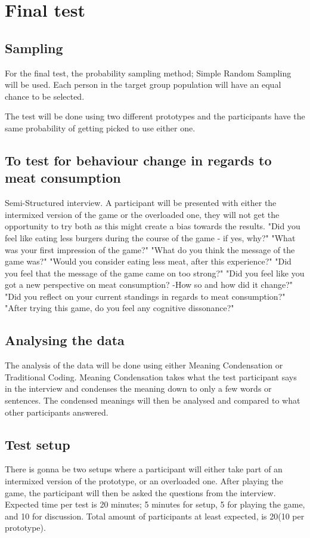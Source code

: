     \section{Final test}
     \subsection{Sampling}
     For the final test, the probability sampling method; Simple Random Sampling will be used\cite{bjoernerBog}. Each person in the target group population will have an equal chance to be selected.
     
     The test will be done using two different prototypes and the participants have the same probability of getting picked to use either one. 
    
    \subsection{To test for behaviour change in regards to meat consumption}
    Semi-Structured interview\cite{bjoernerBog}. A participant will be presented with either the intermixed version of the game or the overloaded one, they will not get the opportunity to try both as this might create a bias towards the results.
    "Did you feel like eating less burgers during the course of the game - if yes, why?"
    "What was your first impression of the game?"
    "What do you think the message of the game was?"
    "Would you consider eating less meat, after this experience?"
    "Did you feel that the message of the game came on too strong?"
    "Did you feel like you got a new perspective on meat consumption? -How so and how did it change?"
    "Did you reflect on your current standings in regards to meat consumption?"
    "After trying this game, do you feel any cognitive dissonance?"
    
    \subsection{Analysing the data}
    The analysis of the data will be done using either Meaning Condensation or Traditional Coding\cite{bjoernerBog}. Meaning Condensation takes what the test participant says in the interview and condenses the meaning down to only a few words or sentences. The condensed meanings will then be analysed and compared to what other participants answered. 
    
    \subsection{Test setup}
    There is gonna be two setups where a participant will either take part of an intermixed version of the prototype, or an overloaded one. After playing the game, the participant will then be asked the questions from the interview. Expected time per test is 20 minutes; 5 minutes for setup, 5 for playing the game, and 10 for discussion. Total amount of participants at least expected, is 20(10 per prototype).